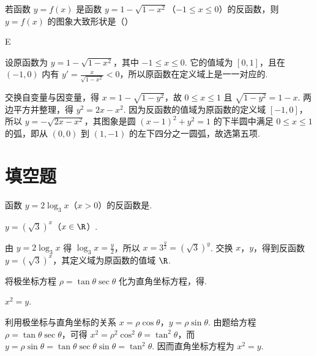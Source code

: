 \begin{problem}

若函数 \(y = f(x) \) 是函数 \(y = 1 - \sqrt{1 - x^2}\)（\(-1 \leq x \leq 0\)）的反函数，则 \(y = f(x) \) 的图象大致形状是（\quad）
\end{problem}

\begin{answer}
E
\end{answer}

\begin{solution}
设原函数为 \(y=1-\sqrt{1-x^2}\)，其中 \(-1\leq x\leq0\). 它的值域为 \([0,1]\)，且在 \((-1,0)\) 内有
\(y'=\frac{x}{\sqrt{1-x^2}}<0\)，所以原函数在定义域上是一一对应的.

交换自变量与因变量，得 \(x=1-\sqrt{1-y^2}\)，故 \(0\leq x\leq1\) 且 \(\sqrt{1-y^2}=1-x\). 两边平方并整理，得 \(y^2=2x-x^2\). 因为反函数的值域为原函数的定义域 \([-1,0]\)，所以 \(y=-\sqrt{2x-x^2}\)，其图象是圆 \((x-1)^2+y^2=1\) 的下半圆中满足 \(0\leq x\leq1\) 的弧，即从 \((0,0)\) 到 \((1,-1)\) 的左下四分之一圆弧，故选第五项.
\end{solution}

\section{填空题}

\begin{problem}

函数 \(y = 2 \log_{3} x\)（\(x > 0\)）的反函数是\fillinblank{}.
\end{problem}

\begin{answer}
\(y = (\sqrt{3})^x\)（\(x \in \R\)）.
\end{answer}

\begin{solution}
由 \(y=2\log_{3}x\) 得 \(\log_{3}x=\frac{y}{2}\)，所以 \(x=3^{\frac{y}{2}}=(\sqrt{3})^y\). 交换 \(x\)，\(y\)，得到反函数 \(y=(\sqrt{3})^x\)，其定义域为原函数的值域 \(\R\).
\end{solution}

\begin{problem}

将极坐标方程 \(\rho = \tan \theta \sec \theta \) 化为直角坐标方程，得\fillinblank{}.
\end{problem}

\begin{answer}
\(x^{2}=y\).
\end{answer}

\begin{solution}
利用极坐标与直角坐标的关系 \(x=\rho\cos\theta\)，\(y=\rho\sin\theta\). 由题给方程 \(\rho=\tan\theta\sec\theta\)，可得
\(x^2=\rho^2\cos^2\theta=\tan^2\theta\)，而 \(y=\rho\sin\theta=\tan\theta\sec\theta\sin\theta=\tan^2\theta\). 因而直角坐标方程为 \(x^2=y\).
\end{solution}


